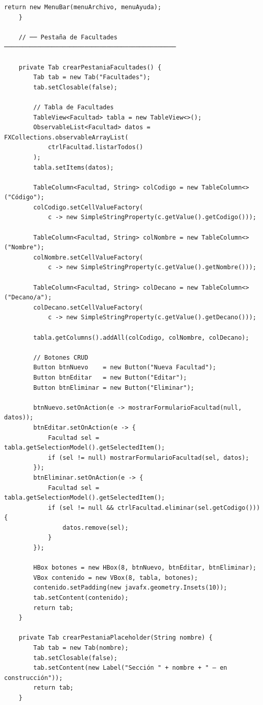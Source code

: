 \begin{lstlisting}[style=javaStyle, caption={Vista principal con JavaFX}, label={lst:javafx-vista}]
        return new MenuBar(menuArchivo, menuAyuda);
    }

    // ── Pestaña de Facultades ───────────────────────────────────────────────

    private Tab crearPestaniaFacultades() {
        Tab tab = new Tab("Facultades");
        tab.setClosable(false);

        // Tabla de Facultades
        TableView<Facultad> tabla = new TableView<>();
        ObservableList<Facultad> datos = FXCollections.observableArrayList(
            ctrlFacultad.listarTodos()
        );
        tabla.setItems(datos);

        TableColumn<Facultad, String> colCodigo = new TableColumn<>("Código");
        colCodigo.setCellValueFactory(
            c -> new SimpleStringProperty(c.getValue().getCodigo()));

        TableColumn<Facultad, String> colNombre = new TableColumn<>("Nombre");
        colNombre.setCellValueFactory(
            c -> new SimpleStringProperty(c.getValue().getNombre()));

        TableColumn<Facultad, String> colDecano = new TableColumn<>("Decano/a");
        colDecano.setCellValueFactory(
            c -> new SimpleStringProperty(c.getValue().getDecano()));

        tabla.getColumns().addAll(colCodigo, colNombre, colDecano);

        // Botones CRUD
        Button btnNuevo    = new Button("Nueva Facultad");
        Button btnEditar   = new Button("Editar");
        Button btnEliminar = new Button("Eliminar");

        btnNuevo.setOnAction(e -> mostrarFormularioFacultad(null, datos));
        btnEditar.setOnAction(e -> {
            Facultad sel = tabla.getSelectionModel().getSelectedItem();
            if (sel != null) mostrarFormularioFacultad(sel, datos);
        });
        btnEliminar.setOnAction(e -> {
            Facultad sel = tabla.getSelectionModel().getSelectedItem();
            if (sel != null && ctrlFacultad.eliminar(sel.getCodigo())) {
                datos.remove(sel);
            }
        });

        HBox botones = new HBox(8, btnNuevo, btnEditar, btnEliminar);
        VBox contenido = new VBox(8, tabla, botones);
        contenido.setPadding(new javafx.geometry.Insets(10));
        tab.setContent(contenido);
        return tab;
    }

    private Tab crearPestaniaPlaceholder(String nombre) {
        Tab tab = new Tab(nombre);
        tab.setClosable(false);
        tab.setContent(new Label("Sección " + nombre + " — en construcción"));
        return tab;
    }


\end{lstlisting}
